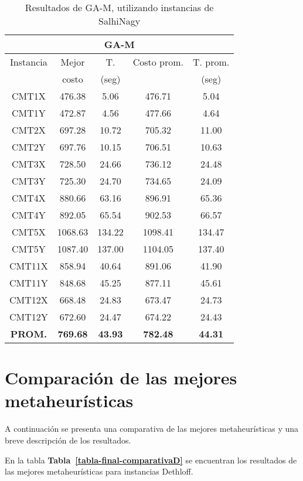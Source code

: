 \hspace{0.5cm}
\begin{minipage}[h]{0.45\linewidth}
\begin{table}[H]
\scriptsize 
\caption{ Resultados de GA-M, utilizando instancias de SalhiNagy }
\centering
\begin{tabular}{|c||c c c c|}
\hline
\multicolumn{5}{|c|}{\bf{GA-M}}\\\hline
Instancia & Mejor & T. & Costo prom. & T. prom.\\
& costo & (seg) & & (seg)\\ [0.5ex]
\hline\hline
CMT1X & 476.38 & 5.06 & 476.71 & 5.04\\
CMT1Y & 472.87 & 4.56 & 477.66 & 4.64\\
CMT2X & 697.28 & 10.72 & 705.32 & 11.00\\
CMT2Y & 697.76 & 10.15 & 706.51 & 10.63\\
CMT3X & 728.50 & 24.66 & 736.12 & 24.48\\
CMT3Y & 725.30 & 24.70 & 734.65 & 24.09\\
CMT4X & 880.66 & 63.16 & 896.91 & 65.36\\
CMT4Y & 892.05 & 65.54 & 902.53 & 66.57\\
CMT5X & 1068.63 & 134.22 & 1098.41 & 134.47\\
CMT5Y & 1087.40 & 137.00 & 1104.05 & 137.40\\
CMT11X & 858.94 & 40.64 & 891.06 & 41.90\\
CMT11Y & 848.68 & 45.25 & 877.11 & 45.61\\
CMT12X & 668.48 & 24.83 & 673.47 & 24.73\\
CMT12Y & 672.60 & 24.47 & 674.22 & 24.43\\\hline\hline\bf{PROM.} & 
\bf{769.68} & \bf{43.93} & \bf{782.48} & \bf{44.31}\\[1ex]\hline
\end{tabular}
\label{table:finalS-IGA}
\end{table}
\end{minipage}

\section{Comparación de las mejores metaheurísticas}

A continuación se presenta una comparativa de las mejores metaheurísticas y una breve descripción de los resultados.

En la tabla \textbf{Tabla~\ref{tabla-final-comparativaD}} se encuentran los resultados de las mejores metaheurísticas para instancias Dethloff.

